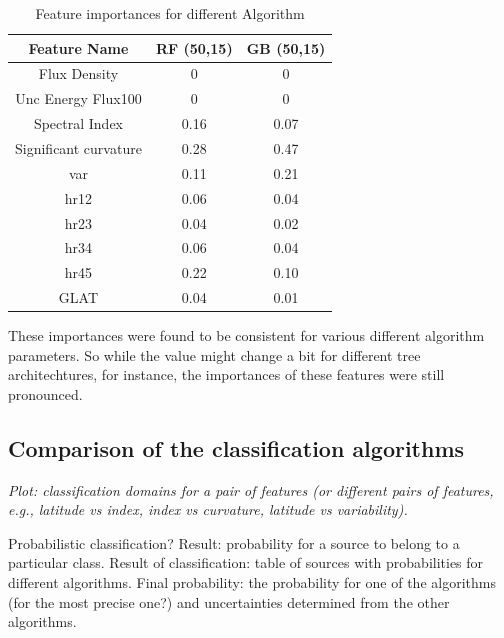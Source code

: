 \begin{table}[!h]
    \tiny
    \centering
    \renewcommand{\tabcolsep}{1mm}
\renewcommand{\arraystretch}{1}

    \begin{tabular}{|c|c|c|}
    \hline
    Feature Name&  RF (50,15)& GB (50,15)\\
    \hline
    Flux Density& 0 & 0        \\
    \hline
    Unc Energy Flux100& 0     & 0 \\
    \hline %
   Spectral Index & 0.16      &   0.07  \\
    \hline %
    Significant curvature& 0.28 &0.47  \\
    \hline
   var&  0.11    &  0.21  \\
    \hline %
    hr12& 0.06 &0.04 \\
    \hline
     hr23& 0.04 &0.02 \\
    \hline
    hr34& 0.06 &0.04 \\
    \hline
   hr45& 0.22 &0.10 \\
    \hline
    GLAT&0.04&0.01\\
    \hline
    \end{tabular}

    \caption{Feature importances for different Algorithm}
    \label{tab:feat_imp}
\end{table}

These importances were found to be consistent for various different algorithm parameters. So while the value might change a bit for different tree architechtures, for instance, the importances of these features were still pronounced. \\
\subsection{Comparison of the classification algorithms}

{\it Plot: classification domains for a pair of features (or different pairs of features, e.g., latitude vs index, index vs curvature, latitude vs variability).}

Probabilistic classification? Result: probability for a source to belong to a particular class.
Result of classification: table of sources with probabilities for different algorithms.
Final probability: the probability for one of the algorithms (for the most precise one?) and uncertainties determined from the other algorithms.

